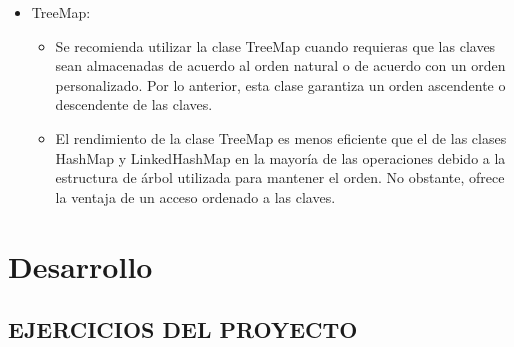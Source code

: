 \documentclass{report}
\begin{document}
\begin{itemize}
\begin{itemize}
    \end{itemize}
    \item TreeMap:
    \begin{itemize}
    \item Se recomienda utilizar la clase TreeMap cuando requieras que las claves sean almacenadas de acuerdo al orden natural o de acuerdo con un orden personalizado. Por lo anterior, esta clase garantiza un orden ascendente o descendente de las claves.
    \item El rendimiento de la clase TreeMap es menos eficiente que el de las clases HashMap y LinkedHashMap en la mayoría de las operaciones debido a la estructura de árbol utilizada para mantener el orden. No obstante, ofrece la ventaja de un acceso ordenado a las claves.
    \end{itemize}
\end{itemize}
\chapter{Desarrollo}
\section*{EJERCICIOS DEL PROYECTO}
\end{document}
